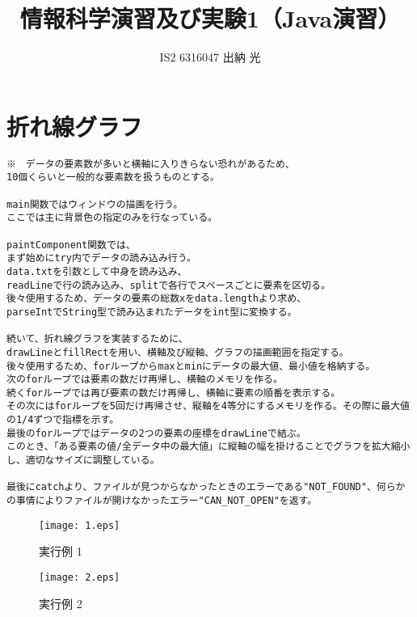 \documentclass{jarticle}
\title{情報科学演習及び実験1（Java演習）}
\author{IS2 6316047 出納 光}
\begin{document}
\maketitle

\newpage
\section{折れ線グラフ}
\begin{verbatim}
※　データの要素数が多いと横軸に入りきらない恐れがあるため、
10個くらいと一般的な要素数を扱うものとする。

main関数ではウィンドウの描画を行う。
ここでは主に背景色の指定のみを行なっている。

paintComponent関数では、
まず始めにtry内でデータの読み込み行う。
data.txtを引数として中身を読み込み、
readLineで行の読み込み、splitで各行でスペースごとに要素を区切る。
後々使用するため、データの要素の総数xをdata.lengthより求め、
parseIntでString型で読み込まれたデータをint型に変換する。

続いて、折れ線グラフを実装するために、
drawLineとfillRectを用い、横軸及び縦軸、グラフの描画範囲を指定する。
後々使用するため、forループからmaxとminにデータの最大値、最小値を格納する。
次のforループでは要素の数だけ再帰し、横軸のメモリを作る。
続くforループでは再び要素の数だけ再帰し、横軸に要素の順番を表示する。
その次にはforループを5回だけ再帰させ、縦軸を4等分にするメモリを作る。その際に最大値の1/4ずつで指標を示す。
最後のforループではデータの2つの要素の座標をdrawLineで結ぶ。
このとき、「ある要素の値/全データ中の最大値」に縦軸の幅を掛けることでグラフを拡大縮小し、適切なサイズに調整している。

最後にcatchより、ファイルが見つからなかったときのエラーである"NOT_FOUND"、何らかの事情によりファイルが開けなかったエラー"CAN_NOT_OPEN"を返す。

\end{verbatim}

\begin{figure}[H]
\begin{center}
\texttt{[image: 1.eps]}
\end{center}
\caption{実行例 1}
\end{figure}

\begin{figure}[H]
\begin{center}
\texttt{[image: 2.eps]}
\end{center}
\caption{実行例 2}
\end{figure}
\end{document}

